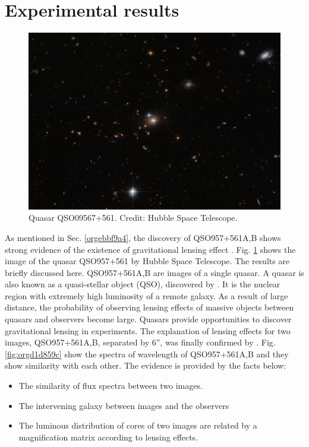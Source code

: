 \documentclass[letter,12pt]{article}
\begin{document}
\section{Experimental results}
\label{sec:org0423fba}
\begin{figure}[htbp]
\centering
\includegraphics[width=.9\linewidth]{./figures/twin.jpg}
\caption{\label{fig:org43fbdc0}Quasar QSO09567+561. Credit: Hubble Space Telescope.}
\end{figure}

\label{org12600c4} As mentioned in Sec. \ref{orgebbf9a4}, the discovery of
QSO957+561A,B shows strong evidence of the existence of
gravitational lensing effect \citep{Walsh:1979nx}. Fig. \ref{fig:org43fbdc0}
shows the image of the quasar QSO957+561 by Hubble Space Telescope.
The results are briefly discussed here. QSO957+561A,B are images of
a single quasar. A quasar is also known as a quasi-stellar object
(QSO), discovered by \cite{schmidt3c1963}. It is the nuclear region
with extremely high luminosity of a remote galaxy. As a result of
large distance, the probability of observing lensing effects of
massive objects between quasars and observers become large. Quasars
provide opportunities to discover gravitational lensing in
experiments. The explanation of lensing effects for two images,
QSO957+561A,B, separated by 6'', was finally confirmed by
\cite{1980ApJ241507Y,1984ApJ287538G}. Fig. \ref{fig:orgd1d859c}
show the spectra of wavelength of QSO957+561A,B and they show
similarity with each other. The evidence is provided by the facts
below:
\begin{itemize}
\item The similarity of flux spectra between two images.
\item The intervening galaxy between images and the observers
\item The luminous distribution of cores of two images are related by a
magnification matrix according to lensing effects.
\end{itemize}
\end{document}
